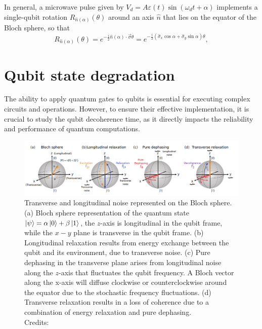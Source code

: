 In general, a microwave pulse given by $V_d = A\varepsilon(t) \sin(\omega_d t + \alpha)$ implements a single-qubit rotation $R_{\hat{n}(\alpha)}(\theta)$ around an axis $\hat{n}$ that lies on the equator of the Bloch sphere, so that
\begin{equation}
    R_{\hat{n}(\alpha)}(\theta) = e^{-\frac{i}{2} \hat{n}(\alpha) \cdot \vec{\sigma} \theta} = e^{-\frac{i}{2} (\hat{\sigma}_x \cos \alpha + \hat{\sigma}_y \sin \alpha) \theta},
\end{equation}

\section{Qubit state degradation}
The ability to apply quantum gates to qubits is essential for executing complex circuits and operations. 
However, to ensure their effective implementation, it is crucial to study the qubit decoherence time, as it directly impacts the reliability and performance of quantum computations.

\begin{figure}[h!]
    \centering
    \includegraphics[width=\textwidth]{figures/png/noise_model.png}
    \caption{Transverse and longitudinal noise represented on the Bloch sphere. 
    (a) Bloch sphere representation of the quantum state $\ket{\psi}= \alpha\ket{0} + \beta\ket{1}$, the $z$-axis is longitudinal in the qubit frame, while the $x-y$ plane is transverse in the qubit frame.
    (b) Longitudinal relaxation results from energy exchange between the qubit and its environment, due to transverse noise.
    (c) Pure dephasing in the transverse plane arises from longitudinal noise along the $z$-axis that fluctuates the qubit frequency. A Bloch vector along the x-axis will diffuse clockwise or counterclockwise around the equator due to the stochastic frequency fluctuations.
    (d)  Transverse relaxation results in a loss of coherence due to a combination of energy relaxation and pure dephasing. \\Credits: \cite{krantz_quantum_2019}}
    \label{fig:noise_model}
\end{figure}

